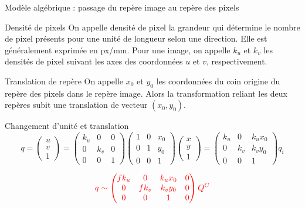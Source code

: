 \documentclass[8pt]{beamer}
\begin{document}
	\begin{frame}{Modèle algébrique : passage du repère image au repère des pixels}
		\begin{block}{Densité de pixels}
			On appelle densité de pixel la grandeur qui détermine le nombre de pixel présents pour une unité de longueur selon une direction. Elle est généralement exprimée en \si{px/\milli\meter}. Pour une image, on appelle $k_u$ et $k_v$ les densités de pixel suivant les axes des coordonnées $u$ et $v$, respectivement.
		\end{block}
		\begin{block}{Translation de repère}
			On appelle $x_0$ et $y_0$ les coordonnées du coin origine du repère des pixels dans le repère image. Alors la transformation reliant les deux repères subit une translation de vecteur $(x_0, y_0)$. 
		\end{block}
		\begin{block}{Changement d'unité et translation}
			$$
			q = \begin{pmatrix}
			u\\v\\1
			\end{pmatrix} = \begin{pmatrix}
			k_u & 0 & 0 \\0 & k_v & 0 \\0 & 0 & 1
			\end{pmatrix}\begin{pmatrix}
			1 & 0 & x_0 \\0 & 1 & y_0 \\0 & 0 & 1
			\end{pmatrix}\begin{pmatrix}
			x\\y\\1
			\end{pmatrix} = \begin{pmatrix}
			k_u & 0 & k_ux_0\\0 & k_v & k_vy_0\\0 & 0 & 1
			\end{pmatrix}q_i
			$$
		\end{block}
		$${\color{red}
			q \sim \begin{pmatrix}
			fk_u & 0 & k_ux_0 & 0\\0 & fk_v & k_vy_0 & 0\\0 & 0 & 1 & 0
			\end{pmatrix}Q^C
		}$$
	\end{frame}
\end{document}

